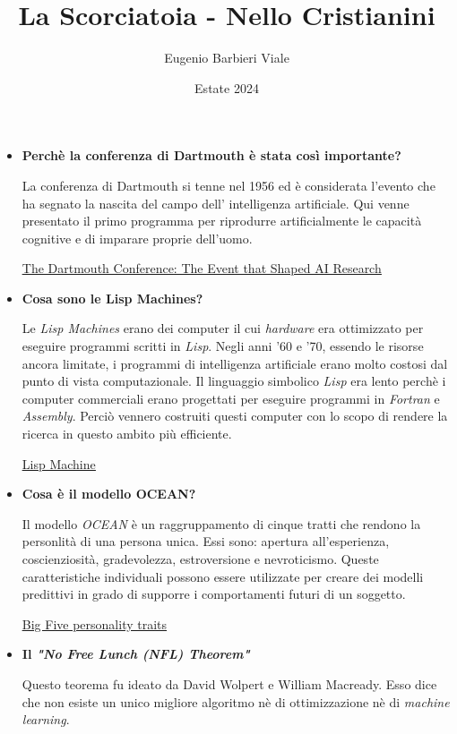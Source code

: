 \documentclass[]{article}
\title{La Scorciatoia - Nello Cristianini}
\author{Eugenio Barbieri Viale}
\date{Estate 2024}
\begin{document}
\maketitle

\begin{itemize}
    \item \textbf{Perchè la conferenza di Dartmouth è stata così importante?} \par
        La conferenza di Dartmouth si tenne nel 1956 ed è considerata l'evento che ha segnato la nascita del campo dell' intelligenza artificiale. Qui venne presentato il primo programma per riprodurre artificialmente le capacità cognitive e di imparare proprie dell'uomo.

        \href{https://aitoolsexplorer.com/ai-history/the-dartmouth-conference-the-event-that-shaped-ai-research/}{\underline{The Dartmouth Conference: The Event that Shaped AI Research}}

    \item \textbf{Cosa sono le Lisp Machines?} \par
        Le \textit{Lisp Machines} erano dei computer il cui \textit{hardware} era ottimizzato per eseguire programmi scritti in \textit{Lisp}. Negli anni '60 e '70, essendo le risorse ancora limitate, i programmi di intelligenza artificiale erano molto costosi dal punto di vista computazionale. Il linguaggio simbolico \textit{Lisp} era lento perchè i computer commerciali erano progettati per eseguire programmi in \textit{Fortran} e \textit{Assembly}. Perciò vennero costruiti questi computer con lo scopo di rendere la ricerca in questo ambito più efficiente.

        \href{https://en.wikipedia.org/wiki/Lisp_machine}{\underline{Lisp Machine}}

    \item \textbf{Cosa è il modello OCEAN?} \par
        Il modello \textit{OCEAN} è un raggruppamento di cinque tratti che rendono la personlità di una persona unica. Essi sono: apertura all'esperienza, coscienziosità, gradevolezza, estroversione e nevroticismo. Queste caratteristiche individuali possono essere utilizzate per creare dei modelli predittivi in grado di supporre i comportamenti futuri di un soggetto.

        \href{https://en.wikipedia.org/wiki/Big_Five_personality_traits}{\underline{Big Five personality traits}}

    \item \textbf{Il \textit{"No Free Lunch (NFL) Theorem"}} \par
        Questo teorema fu ideato da David Wolpert e William Macready. Esso dice che non esiste un unico migliore algoritmo nè di ottimizzazione nè di \textit{machine learning}.


\end{itemize}
\end{document}
